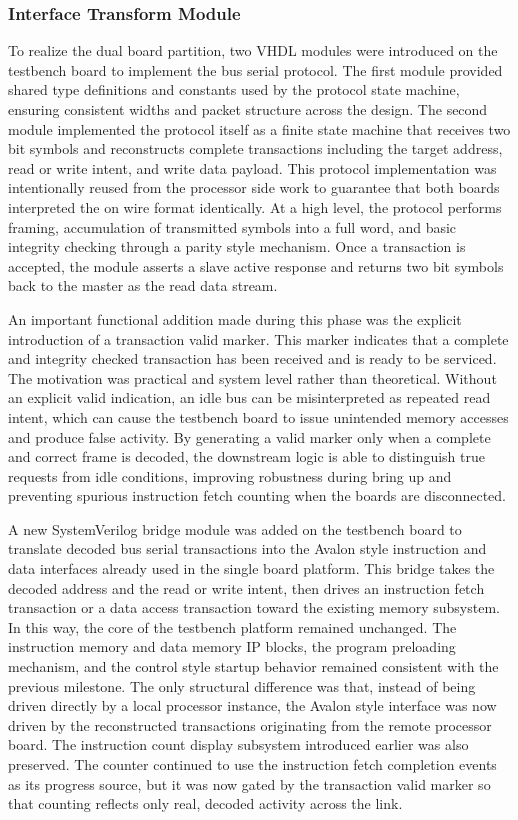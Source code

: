 \documentclass[12pt]{article}
\begin{document}
\subsubsection{Interface Transform Module}

To realize the dual board partition, two VHDL modules were introduced on the testbench board to implement the bus serial protocol. The first module provided shared type definitions and constants used by the protocol state machine, ensuring consistent widths and packet structure across the design. The second module implemented the protocol itself as a finite state machine that receives two bit symbols and reconstructs complete transactions including the target address, read or write intent, and write data payload. This protocol implementation was intentionally reused from the processor side work to guarantee that both boards interpreted the on wire format identically. At a high level, the protocol performs framing, accumulation of transmitted symbols into a full word, and basic integrity checking through a parity style mechanism. Once a transaction is accepted, the module asserts a slave active response and returns two bit symbols back to the master as the read data stream.

An important functional addition made during this phase was the explicit introduction of a transaction valid marker. This marker indicates that a complete and integrity checked transaction has been received and is ready to be serviced. The motivation was practical and system level rather than theoretical. Without an explicit valid indication, an idle bus can be misinterpreted as repeated read intent, which can cause the testbench board to issue unintended memory accesses and produce false activity. By generating a valid marker only when a complete and correct frame is decoded, the downstream logic is able to distinguish true requests from idle conditions, improving robustness during bring up and preventing spurious instruction fetch counting when the boards are disconnected.


A new SystemVerilog bridge module was added on the testbench board to translate decoded bus serial transactions into the Avalon style instruction and data interfaces already used in the single board platform. This bridge takes the decoded address and the read or write intent, then drives an instruction fetch transaction or a data access transaction toward the existing memory subsystem. In this way, the core of the testbench platform remained unchanged. The instruction memory and data memory IP blocks, the program preloading mechanism, and the control style startup behavior remained consistent with the previous milestone. The only structural difference was that, instead of being driven directly by a local processor instance, the Avalon style interface was now driven by the reconstructed transactions originating from the remote processor board. The instruction count display subsystem introduced earlier was also preserved. The counter continued to use the instruction fetch completion events as its progress source, but it was now gated by the transaction valid marker so that counting reflects only real, decoded activity across the link.
\end{document}
